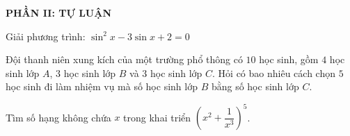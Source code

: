 \noindent
\textbf{PHẦN II: TỰ LUẬN}
\begin{bt}%
Giải phương trình: $\sin^2x -3\sin x +2 =0$
\end{bt}

\begin{bt}%
Đội thanh niên xung kích của một trường phổ thông có $10$ học sinh, gồm $4$ học sinh lớp $A$, $3$ học sinh lớp $B$ và $3$ học sinh lớp $C$. Hỏi có bao nhiêu cách chọn $5$ học sinh đi làm nhiệm vụ mà số học sinh lớp $B$ bằng số học sinh lớp $C$.
\end{bt}

\begin{bt}%
Tìm số hạng không chứa $x$ trong khai triển  $\left (x^2 + \dfrac{1}{x^3}\right )^5$.
\end{bt}

